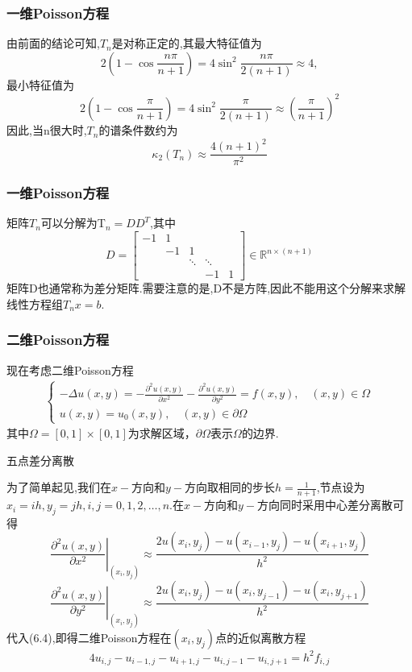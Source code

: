 \documentclass[notheorems,serif]{beamer}
\renewcommand{\normalsize}{\wuhao}
\newcommand{\wuhao}{\fontsize{10.5pt}{\baselineskip}\selectfont}
\begin{document}
\begin{frame}\frametitle{一维Poisson方程}
由前面的结论可知,$T_n$是对称正定的,其最大特征值为
$$
2\left(1-\cos \frac{n \pi}{n+1}\right)=4 \sin ^{2} \frac{n \pi}{2(n+1)} \approx 4,
$$
最小特征值为
$$
2\left(1-\cos \frac{\pi}{n+1}\right)=4 \sin ^{2} \frac{\pi}{2(n+1)} \approx\left(\frac{\pi}{n+1}\right)^{2}
$$
因此,当n很大时,$T_n$的谱条件数约为
$$
\kappa_{2}\left(T_{n}\right) \approx \frac{4(n+1)^{2}}{\pi^{2}}
$$
\end{frame}

\begin{frame}\frametitle{一维Poisson方程}
矩阵$T_n$可以分解为T$_n=DD^T$,其中
$$
D=\left[\begin{array}{ccccc}{-1} & {1} & {} & {} & {} \\ {} & {-1} & {1} & {} \\ {} & {} & {\ddots} & {\ddots} \\ {} & {} & {} & {-1} & {1}\end{array}\right] \in \mathbb{R}^{n \times(n+1)}
$$
矩阵D也通常称为{\color{blue}差分矩阵}.需要注意的是,D不是方阵,因此不能用这个分解来求解线性方程组$T_nx=b.$
\end{frame}

\begin{frame}\frametitle{二维Poisson方程}
现在考虑二维Poisson方程
\begin{align}
\left\{\begin{array}{l}{-\Delta u(x, y)=-\frac{\partial^{2} u(x, y)}{\partial x^{2}}-\frac{\partial^{2} u(x, y)}{\partial y^{2}}=f(x, y), \quad(x, y) \in \Omega} \\ {u(x, y)=u_{0}(x, y), \quad(x, y) \in \partial \Omega}\end{array}\right.
\tag{6.4}
\end{align}
其中$\Omega=[0,1] \times[0,1]$为求解区域，$\partial \Omega$表示$\Omega$的边界.
\end{frame}

\begin{frame}
\Large {\color{blue}五点差分离散}

\quad

\normalsize
为了简单起见,我们在$x-$方向和$y-$方向取相同的步长$h=\frac{1}{n+1}$,节点设为
$x_{i}=i h, y_{j}=j h, i, j=0,1,2, \ldots, n.$在$x-$方向和$y-$方向同时采用中心差分离散可得
$$
\left.\frac{\partial^{2} u(x, y)}{\partial x^{2}}\right|_{\left(x_{i}, y_{j}\right)} \approx \frac{2 u\left(x_{i}, y_{j}\right)-u\left(x_{i-1}, y_{j}\right)-u\left(x_{i+1}, y_{j}\right)}{h^{2}}
$$
$$
\left.\frac{\partial^{2} u(x, y)}{\partial y^{2}}\right|_{\left(x_{i}, y_{j}\right)} \approx \frac{2 u\left(x_{i}, y_{j}\right)-u\left(x_{i}, y_{j-1}\right)-u\left(x_{i}, y_{j+1}\right)}{h^{2}}
$$
代入({\color{blue}6.4}),即得二维Poisson方程在$(x_i, y_j)$点的近似离散方程
$$
\boxed {4 u_{i, j}-u_{i-1, j}-u_{i+1, j}-u_{i, j-1}-u_{i, j+1}=h^{2} f_{i, j}}
$$
\end{frame}
\end{document}
